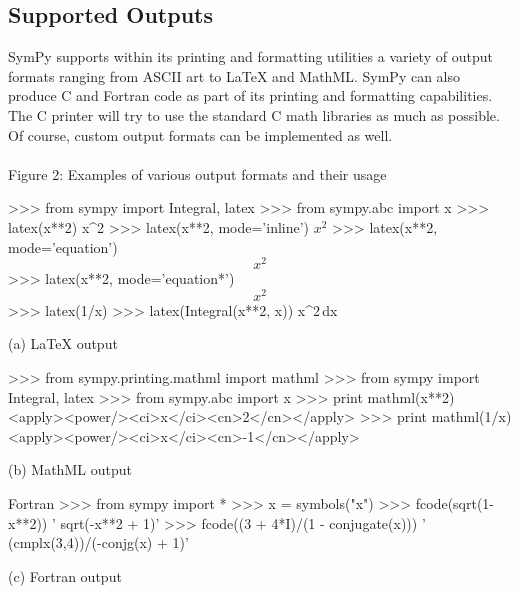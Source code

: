 \documentclass[11pt,a4paper,oneside]{report}
\begin{document}
\subsection*{Supported Outputs}
SymPy supports within its printing and formatting utilities a variety of output formats ranging from ASCII art to LaTeX and MathML. SymPy can also produce C and Fortran code as part of its printing and formatting capabilities. The C printer will try to use the standard C math libraries as much as possible. Of course, custom output formats can be implemented as well.\\\\
Figure 2: Examples of various output formats and their usage
\begin{verbatimtab}
>>> from sympy import Integral, latex
>>> from sympy.abc import x
>>> latex(x**2)
x^{2}
>>> latex(x**2, mode='inline')
$x^{2}$
>>> latex(x**2, mode='equation')
\begin{equation}x^{2}\end{equation}
>>> latex(x**2, mode='equation*')
\begin{equation*}x^{2}\end{equation*}
>>> latex(1/x)
>>> latex(Integral(x**2, x))
\int x^{2}\,dx
\end{verbatimtab}
(a) LaTeX output
\begin{verbatimtab}
>>> from sympy.printing.mathml import mathml
>>> from sympy import Integral, latex
>>> from sympy.abc import x
>>> print mathml(x**2)
<apply><power/><ci>x</ci><cn>2</cn></apply>
>>> print mathml(1/x)
<apply><power/><ci>x</ci><cn>-1</cn></apply>
\end{verbatimtab}
(b) MathML output
\begin{verbatimtab}
Fortran
>>> from sympy import *
>>> x = symbols("x")
>>> fcode(sqrt(1-x**2))
'      sqrt(-x**2 + 1)'
>>> fcode((3 + 4*I)/(1 - conjugate(x)))
'      (cmplx(3,4))/(-conjg(x) + 1)'
\end{verbatimtab}
(c) Fortran output
\end{document}
